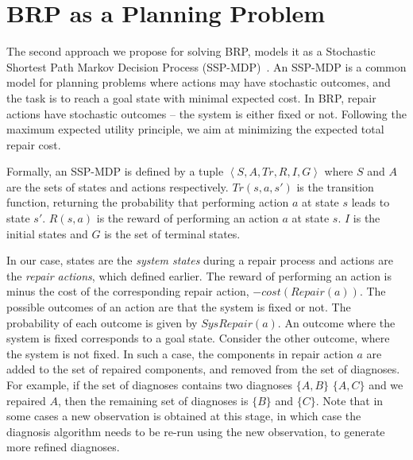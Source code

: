 \documentclass[a4paper,11pt]{report}
\begin{document}
\chapter{BRP as a Planning Problem}

The second approach we propose for solving BRP, models it as a Stochastic Shortest Path Markov Decision Process (SSP-MDP)~\cite{bertsekas1995dynamic}. An SSP-MDP is a common model for planning problems where actions may have stochastic outcomes, and the task is to reach a goal state with minimal expected cost. 
In BRP, repair actions have stochastic outcomes -- the system is either fixed or not. Following the maximum expected utility principle, we aim at minimizing the expected total repair cost. %

Formally, an SSP-MDP is defined by a tuple $\left \langle S, A,Tr,R,I,G \right \rangle$ where $S$ and $A$ are the sets of states and actions respectively. $Tr(s,a,{s}')$ is the transition function, returning the probability that performing action $a$ at state $s$ leads to state ${s}'$. $R(s,a)$ is the reward of performing an action $a$ at state $s$. $I$ is the initial states and $G$ is the set of terminal states.

In our case, states are the \emph{system states} during a repair process and actions are the \emph{repair actions}, which defined earlier. The reward of performing an action is minus the cost of the corresponding repair action, $-cost(Repair(a))$. The possible outcomes of an action are that the system is fixed or not. The probability of each outcome is given by $SysRepair(a)$. An outcome where the system is fixed corresponds to a goal state.
Consider the other outcome, where the system is not fixed. In such a case, the components in repair action $a$ are added to the set of repaired components, 
and removed from the set of diagnoses. For example, 
if the set of diagnoses contains two diagnoses $\{A,B\}$
 $\{A,C\}$ and we repaired $A$, then the remaining set of diagnoses is $\{B\}$ and $\{C\}$. 
 Note that in some cases a new observation is obtained at this stage, in which case the diagnosis algorithm needs to be re-run using the new observation, to generate more refined diagnoses. 
 
\end{document}
